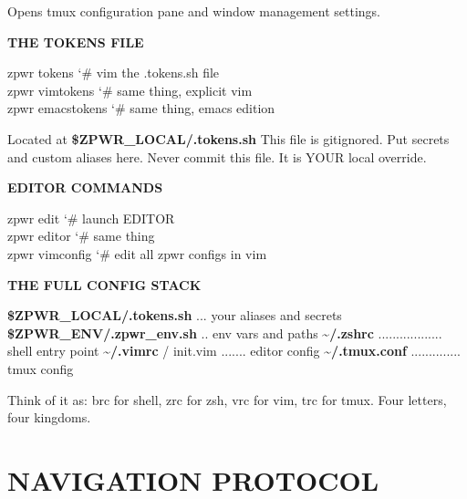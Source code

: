 \documentclass[11pt,a4paper,twoside]{book}
\begin{document}
Opens tmux configuration pane and window management settings.


\vspace{12pt}
{\bfseries\color{neonyellow} THE TOKENS FILE}\vspace{4pt}

\begin{codebox}
\color{neongreen}zpwr tokens       {\char`\#} vim the .tokens.sh file\\
\color{neongreen}zpwr vimtokens    {\char`\#} same thing, explicit vim\\
\color{neongreen}zpwr emacstokens  {\char`\#} same thing, emacs edition\\
\end{codebox}

Located at \textbf{\$ZPWR\_LOCAL/.tokens.sh} This file is gitignored. Put secrets and custom aliases here. Never commit this file. It is YOUR local override.


\vspace{12pt}
{\bfseries\color{neonyellow} \textbf{EDITOR} COMMANDS}\vspace{4pt}

\begin{codebox}
\color{neongreen}zpwr edit      {\char`\#} launch EDITOR\\
\color{neongreen}zpwr editor    {\char`\#} same thing\\
\color{neongreen}zpwr vimconfig {\char`\#} edit all zpwr configs in vim\\
\end{codebox}


\vspace{12pt}
{\bfseries\color{neonyellow} THE FULL CONFIG STACK}\vspace{4pt}

\textbf{\$ZPWR\_LOCAL/.tokens.sh} ... your aliases and secrets \textbf{\$ZPWR\_ENV/.zpwr\_env.sh} .. env vars and paths \textbf{\textasciitilde{}/.zshrc} .................. shell entry point \textbf{\textasciitilde{}/.vimrc} / init.vim ....... editor config \textbf{\textasciitilde{}/.tmux.conf} .............. tmux config

Think of it as: brc for shell, zrc for zsh, vrc for vim, trc for tmux. Four letters, four kingdoms.


\vspace{16pt}


\chapter{NAVIGATION PROTOCOL}
\end{document}
